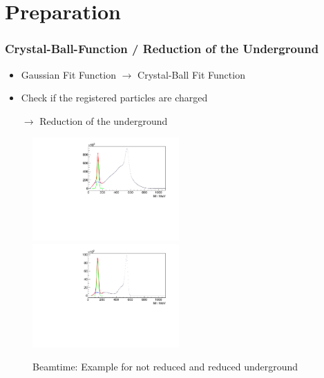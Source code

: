 \documentclass[slidestop,compress,mathserif]{beamer}
\begin{document}
\section{Preparation}
\begin{frame}
	\frametitle{Crystal-Ball-Function / Reduction of the Underground}
	\begin{itemize}
		\item Gaussian Fit Function $\rightarrow$ Crystal-Ball Fit Function
		\pause
		\item Check if the registered particles are charged 
		
		$\rightarrow$ Reduction of the underground
	\end{itemize}


\begin{figure}
	
		\includegraphics[width=0.50\textwidth]{Pictures/20171904RealIntervalFitExample}
	\hfill
		\includegraphics[width=0.50\textwidth]{Pictures/20171904RealUnchargedFitExample}
		\caption{Beamtime: Example for not reduced and reduced underground}
\end{figure}

\end{frame}
\end{document}
